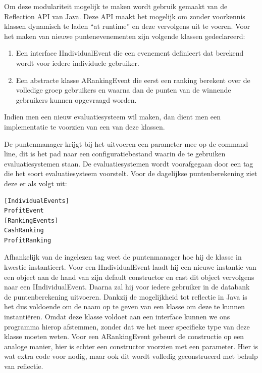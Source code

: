 Om deze modulariteit mogelijk te maken wordt gebruik gemaakt van de Reflection API van Java. Deze API maakt het mogelijk om zonder voorkennis klassen dynamisch te laden ``at runtime'' en deze vervolgens uit te voeren. Voor het maken van nieuwe puntenevenementen zijn volgende klassen gedeclareerd:

\begin{enumerate}
\item Een interface IIndividualEvent die een evenement definieert dat berekend wordt voor iedere individuele gebruiker.
\item Een abstracte klasse ARankingEvent die eerst een ranking berekent over de volledige groep gebruikers en waarna dan de punten van de winnende gebruikers kunnen opgevraagd worden.
\end{enumerate}

Indien men een nieuw evaluatiesysteem wil maken, dan dient men een implementatie te voorzien van een van deze klassen.

De puntenmanager krijgt bij het uitvoeren een parameter mee op de command-line, dit is het pad naar een configuratiebestand waarin de te gebruiken evaluatiesystemen staan. De  evaluatiesystemen wordt voorafgegaan door een tag die het soort evaluatiesysteem voorstelt. Voor de dagelijkse puntenberekening ziet deze er als volgt uit:

\begin{verbatim}
[IndividualEvents]
ProfitEvent
[RankingEvents]
CashRanking
ProfitRanking
\end{verbatim}

Afhankelijk van de ingelezen tag weet de puntenmanager hoe hij de klasse in kwestie instantieert. Voor een IIndividualEvent laadt hij een nieuwe instantie van een object aan de hand van zijn default constructor en cast dit object vervolgens naar een IIndividualEvent. Daarna zal hij voor iedere gebruiker in de databank de puntenberekening uitvoeren. Dankzij de mogelijkheid tot reflectie in Java is het dus voldoende om de naam op te geven van een klasse om deze te kunnen instanti\"eren. Omdat deze klasse voldoet aan een interface kunnen we ons programma hierop afstemmen, zonder dat we het meer specifieke type van deze klasse moeten weten. Voor een ARankingEvent gebeurt de constructie op een analoge manier, hier is echter een constructor voorzien met een parameter. Hier is wat extra code voor nodig, maar ook dit wordt volledig geconstrueerd met behulp van reflectie.

%
%

